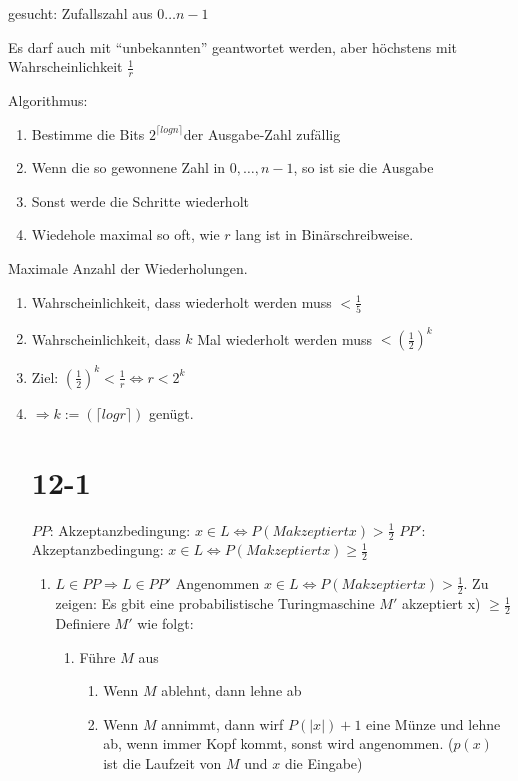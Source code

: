 \documentclass[12pt, oneside, a4paper, numbers=enddot, abstracton, parskip=full]{scrreprt}
\begin{document}
\begin{enumerate}
gesucht: Zufallszahl aus $0 \dots n-1$

Es darf auch mit ``unbekannten'' geantwortet werden, aber höchstens mit Wahrscheinlichkeit $\frac{1}{r}$

Algorithmus:
\begin{enumerate}
\item Bestimme die Bits $2^{\lceil log n  \rceil }$der Ausgabe-Zahl zufällig
\item Wenn die so gewonnene Zahl in ${0, \dots,n-1}$, so ist sie die Ausgabe 
\item Sonst werde die Schritte wiederholt
\item Wiedehole maximal so oft, wie $r$ lang ist in Binärschreibweise.
\end{enumerate}

Maximale Anzahl der Wiederholungen.
\begin{enumerate}
\item Wahrscheinlichkeit, dass wiederholt werden muss $<\frac{1}{5}$
\item Wahrscheinlichkeit, dass $k$ Mal wiederholt werden muss $<(\frac{1}{2})^k$
\item Ziel: $(\frac{1}{2})^k < \frac{1}{r} \Leftrightarrow r<2^k$
\item $\Rightarrow k := (\lceil log r \rceil )$ genügt.

\section{12-1}
$PP$: Akzeptanzbedingung: $x \in L \Leftrightarrow P(M akzeptiert x) > \frac{1}{2}$
$PP'$: Akzeptanzbedingung: $x \in L \Leftrightarrow P(M akzeptiert x) \geq \frac{1}{2}$

\begin{enumerate}
\item $L \in PP \Rightarrow L \in PP'$
  Angenommen $x \in L \Leftrightarrow P (M akzeptiert x) > \frac{1}{2}$. Zu zeigen: Es gbit eine probabilistische Turingmaschine $M'$ akzeptiert x) $\geq \frac{1}{2}$
  Definiere $M'$ wie folgt:
  \begin{enumerate}
  \item Führe $M$ aus
    \begin{enumerate}
    \item Wenn $M$ ablehnt, dann lehne ab
    \item Wenn $M$ annimmt, dann wirf $P(|x|) + 1$ eine Münze und lehne ab,
      wenn immer Kopf kommt, sonst wird angenommen. ($p(x)$ ist die Laufzeit von $M$ und $x$ die Eingabe)
    \end{enumerate}
  \end{enumerate}
\end{enumerate}


\end{enumerate}
\end{enumerate}
\end{document}
